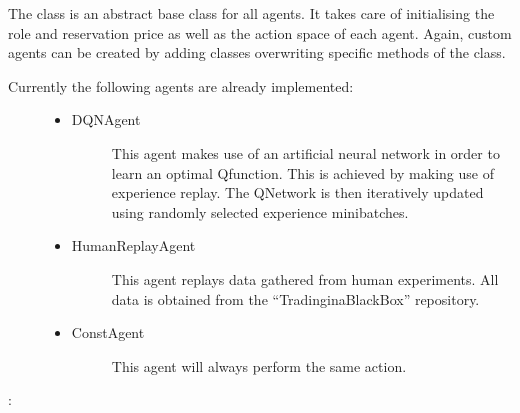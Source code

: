 \documentclass[letterpaper,10pt,english]{sphinxmanual}
\begin{document}
\sphinxAtStartPar
{}

\sphinxAtStartPar
The  class is an abstract base class for all agents. It takes care of initialising the role and
reservation price as well as the action space of each agent. Again, custom agents can be created by adding classes
overwriting specific methods of the  class.
\begin{description}
\item[{Currently the following agents are already implemented:}] \leavevmode\begin{itemize}
\item {} \begin{description}
\item[{DQNAgent}] \leavevmode
\sphinxAtStartPar
This agent makes use of an artificial neural network in order to learn an optimal Q\sphinxhyphen{}function.
This is achieved by making use of experience replay. The Q\sphinxhyphen{}Network is then iteratively updated
using randomly selected experience minibatches.

\end{description}

\item {} \begin{description}
\item[{HumanReplayAgent}] \leavevmode
\sphinxAtStartPar
This agent replays data gathered from human experiments. All data is obtained from the
“Trading\sphinxhyphen{}in\sphinxhyphen{}a\sphinxhyphen{}Black\sphinxhyphen{}Box” repository.

\end{description}

\item {} \begin{description}
\item[{ConstAgent}] \leavevmode
\sphinxAtStartPar
This agent will always perform the same action.

\end{description}

\end{itemize}

\end{description}

\sphinxAtStartPar
{}:
\end{document}

